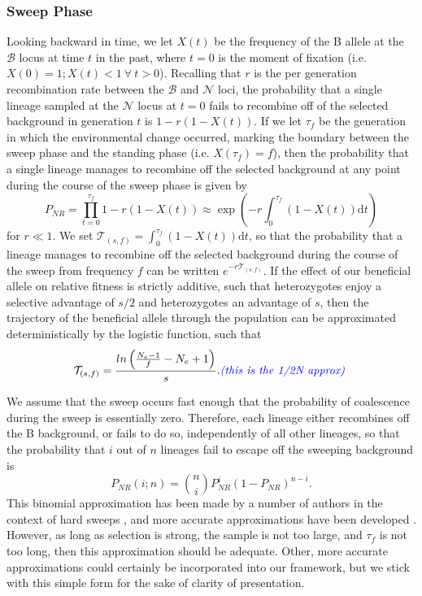 \documentclass[a4paper,10pt]{article}
\newcommand{\fancyN}{$\mathcal N$ }
\newcommand{\fancyB}{$\mathcal B$ }
\newcommand{\jb}[1]{{\it\color{blue} (#1)} }
\begin{document}
\subsubsection{Sweep Phase}
Looking backward in time, we let $X\left(t\right)$ be the frequency of the B allele at the \fancyB locus at time $t$ in the past, where $t=0$ is the moment of fixation (i.e. $X\left(0\right) = 1; X\left(t\right) < 1\ \forall\ t > 0$). Recalling that $r$ is the per generation recombination rate between the \fancyB and \fancyN loci, the probability that a single lineage sampled at the \fancyN locus at $t=0$ fails to recombine off of the selected background in generation $t$ is $1-r\left(1-X(t)\right)$. If we let $\tau_{f}$ be the generation in which the environmental change occurred, marking the boundary between the sweep phase and the standing phase (i.e. $X\left(\tau_{f}\right) = f$), then the probability that a single lineage manages to recombine off the selected background at any point during the course of the sweep phase is given by
\begin{equation}
P_{NR} = \prod_{t=0}^{\tau_{f}} 1-r\left(1-X(t)\right)  \approx \exp \left(-r \int_0^{\tau_{f}}(1-X\left(t\right))\mathrm{d} t \right)
\end{equation}
for $r \ll 1$. We set  $\mathcal{T}_{\left(s,f\right)} = \int_0^{\tau_{f}}(1-X\left(t\right))\mathrm{d}t$, so that the probability that a lineage manages to recombine off the selected background during the course of the sweep from frequency $f$ can be written $e^{-r\mathcal{T}_{\left(s,f\right)}}$. If the effect of our beneficial allele on relative fitness is strictly additive, such that heterozygotes enjoy a selective advantage of $s/2$ and heterozygotes an advantage of $s$, then the trajectory of the beneficial allele through the population can be approximated deterministically by the logistic function, such that 
\begin{equation}
	\mathcal{T}_{\left(s,f\right)} = \frac{ln\left(\frac{N_e - 1}{f}-N_e + 1\right)}{s}. \textrm{\jb{this is the 1/2N approx}}
\end{equation}

We assume that the sweep occurs fast enough that the probability of coalescence during the sweep is essentially zero. Therefore, each lineage either recombines off the B background, or fails to do so, independently of all other lineages, so that the probability that $i$ out of $n$ lineages fail to escape off the sweeping background is
\begin{equation}
P_{NR}(i;n) = {n \choose i} P_{NR}^{i} (1-P_{NR})^{n-i}.
\end{equation}
This binomial approximation has been made by a number of authors in the context of hard sweeps \citep{Barton}, and more accurate approximations have been developed \citep{Etheridge2006}. However, as long as selection is strong, the sample is not too large,  and $\tau_{f}$ is not too long, then this approximation should be adequate. Other, more accurate approximations could certainly be incorporated into our framework, but we stick with this simple form for the sake of clarity of presentation.
\end{document}
